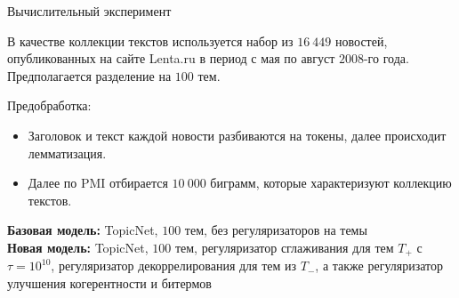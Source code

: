 \documentclass{beamer}
\begin{document}
\begin{frame}{Вычислительный эксперимент}

В качестве коллекции текстов используется набор из $16 \ 449$ новостей, опубликованных на сайте Lenta.ru в период с мая по август $2008$-го года.
Предполагается разделение на $100$ тем. 

\begin{block}{Предобработка:}
\begin{itemize}
    \item Заголовок и текст каждой новости разбиваются на токены, далее происходит лемматизация.
    \item Далее по PMI отбирается $10 \ 000$ биграмм, которые характеризуют коллекцию текстов.
\end{itemize}
\end{block}

\textbf{Базовая модель:} TopicNet, $100$ тем, без регуляризаторов на темы \\
\textbf{Новая модель:} TopicNet, $100$ тем, регуляризатор сглаживания для тем $T_+$ с $\tau = {10}^{10}$, регуляризатор декоррелирования для тем из $T_-$, а также регуляризатор улучшения когерентности и битермов

\end{frame}
\end{document}
